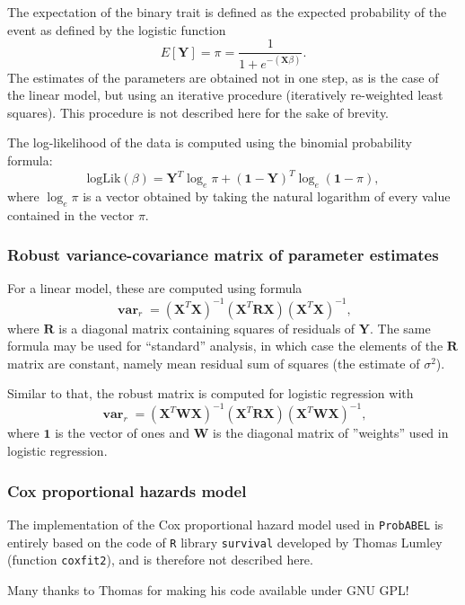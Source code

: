 \documentclass[12pt,a4paper]{article}
\DeclareMathOperator{\var}{\mathbf{var}}
\newcommand{\PA}{\texttt{ProbABEL}}
\begin{document}
The expectation of the binary trait is defined as the expected
probability of the event as defined by the logistic
function
$$
E[\mathbf{Y}] = \pi = \frac{ 1 }{ 1 + e^{-(\mathbf{X}\beta)} }.
$$
The estimates of the parameters are obtained not in one
step, as is the case of the linear model, but using an iterative
procedure (iteratively re-weighted least squares). This
procedure is not described here for the sake of brevity.

The log-likelihood of the data is computed using the
binomial probability formula:
$$
\mathrm{logLik}(\beta) = \mathbf{Y}^T \log_e \pi + (\mathbf{1} -
\mathbf{Y})^T \log_e (\mathbf{1}-\pi),
$$
where $\log_e \pi$ is a vector obtained by taking the natural
logarithm of every value contained in the vector $\pi$.

\subsubsection{Robust variance-covariance matrix of parameter estimates}
For a linear model, these are computed using formula
$$
\var_r = (\mathbf{X}^T\mathbf{X})^{-1} (\mathbf{X}^T\mathbf{R}\mathbf{X})
(\mathbf{X}^T\mathbf{X})^{-1},
$$
where $\mathbf{R}$ is a diagonal matrix containing squares of residuals
of $\mathbf{Y}$. The
same formula may be used for ``standard'' analysis, in which case
the elements of the $\mathbf{R}$ matrix are constant, namely mean
residual sum of squares (the estimate of $\sigma^2$).

Similar to that, the robust matrix is computed for logistic regression with
$$
\var_r = (\mathbf{X}^T \mathbf{W} \mathbf{X})^{-1} (\mathbf{X}^T\mathbf{R}\mathbf{X})
(\mathbf{X}^T \mathbf{W} \mathbf{X})^{-1},
$$
where $\mathbf{1}$ is the vector of ones and $\mathbf{W}$ is the diagonal matrix
of ''weights'' used in logistic regression.


\subsubsection{Cox proportional hazards model}
The implementation of the Cox proportional hazard model used
in \PA{} is entirely based on the code of \texttt{R}
library \texttt{survival} developed by Thomas Lumley
(function \texttt{coxfit2}), and is therefore not described here.

Many thanks to Thomas for making his code available under GNU GPL!
\end{document}
